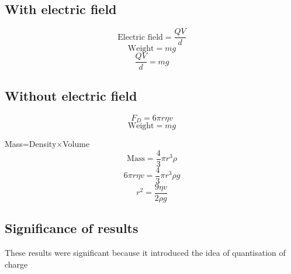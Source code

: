 \documentclass[12pt]{article}
\begin{document}
\subsection{With electric field}
$$\textrm{Electric field}=\frac{QV}{d}$$
$$\textrm{Weight}=mg$$
$$\frac{QV}{d}=mg$$
\subsection{Without electric field}
$$F_D=6\pi r\eta v$$
$$\textrm{Weight}=mg$$
\begin{center}
Mass=Density$\times$Volume
$$\textrm{Mass}=\frac{4}{3}\pi r^3\rho$$
$$6\pi r\eta v=\frac{4}{3}\pi r^3\rho g$$
$$r^2=\frac{9\eta v}{2\rho g}$$
\end{center}
\subsection{Significance of results}
These results were significant because it introduced the idea of quantisation of charge
\end{document}
